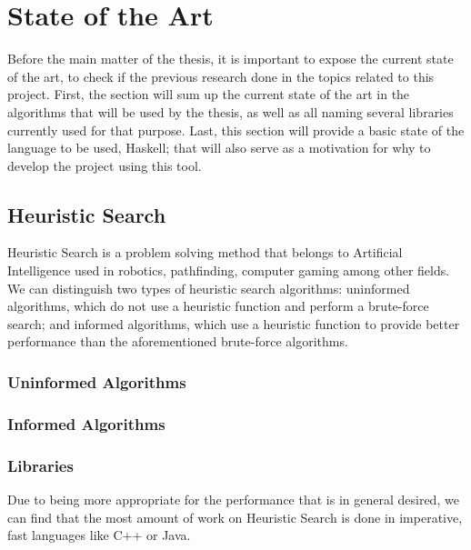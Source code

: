 \section{State of the Art}

Before the main matter of the thesis, it is important to expose the current
state of the art, to check if the previous research done in the topics
related to this project. First, the section will sum up the current state of
the art in the algorithms that will be used by the thesis, as well as all
naming several libraries currently used for that purpose. Last, this section
will provide a basic state of the language to be used, Haskell; that will also
serve as a motivation for why to develop the project using this tool.\\

\subsection{Heuristic Search}

Heuristic Search is a problem solving method that belongs to Artificial
Intelligence \cite{rusell-2003-aima} used in robotics, pathfinding, computer
gaming among other fields. We can distinguish two types of heuristic search
algorithms: uninformed algorithms, which do not use a heuristic function and
perform a brute-force search; and informed algorithms, which use a heuristic
function to provide better performance than the aforementioned brute-force
algorithms.\\

\subsubsection{Uninformed Algorithms}

\subsubsection{Informed Algorithms}

\subsubsection{Libraries}

Due to being more appropriate for the performance that is in general desired,
we can find that the most amount of work on Heuristic Search is done in
imperative, fast languages like C++ or Java.\\

